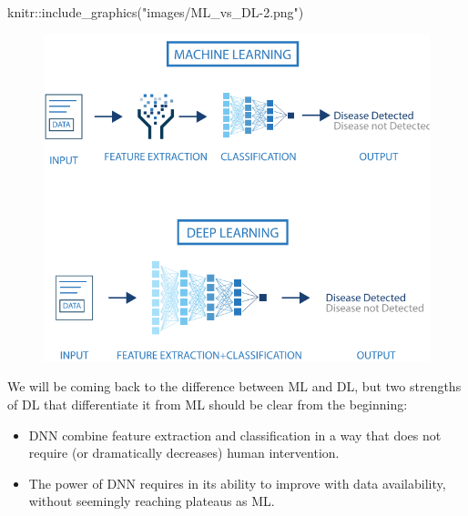 \documentclass[
  letterpaper,
  DIV=11,
  numbers=noendperiod,
  oneside]{scrartcl}
\newenvironment{Shaded}{\begin{snugshade}}{\end{snugshade}}
\newcommand{\FunctionTok}[1]{\textcolor[rgb]{0.28,0.35,0.67}{#1}}
\newcommand{\NormalTok}[1]{\textcolor[rgb]{0.00,0.23,0.31}{#1}}
\newcommand{\SpecialCharTok}[1]{\textcolor[rgb]{0.37,0.37,0.37}{#1}}
\newcommand{\StringTok}[1]{\textcolor[rgb]{0.13,0.47,0.30}{#1}}
\providecommand{\tightlist}{%
  \setlength{\itemsep}{0pt}\setlength{\parskip}{0pt}}\usepackage{longtable,booktabs,array}
\begin{document}
\begin{Shaded}
\begin{Highlighting}[]
\NormalTok{knitr}\SpecialCharTok{::}\FunctionTok{include\_graphics}\NormalTok{(}\StringTok{"images/ML\_vs\_DL{-}2.png"}\NormalTok{)}
\end{Highlighting}
\end{Shaded}

\begin{figure}[H]

{\centering \includegraphics[width=1\textwidth,height=\textheight]{images/ML_vs_DL-2.png}

}

\end{figure}

We will be coming back to the difference between ML and DL, but two
strengths of DL that differentiate it from ML should be clear from the
beginning:

\begin{itemize}
\tightlist
\item
  DNN combine feature extraction and classification in a way that does
  not require (or dramatically decreases) human intervention.
\item
  The power of DNN requires in its ability to improve with data
  availability, without seemingly reaching plateaus as ML.
\end{itemize}
\end{document}
